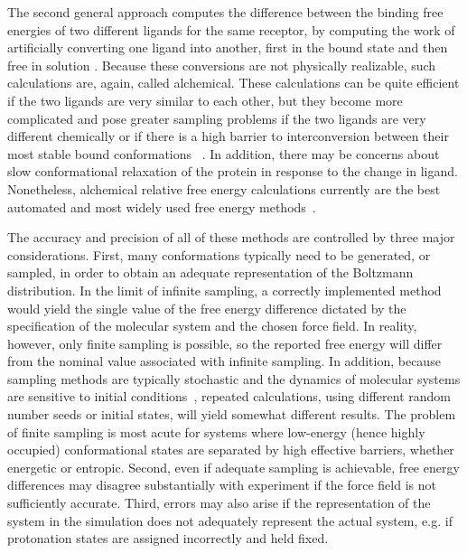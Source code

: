 \documentclass[aps,pre,twocolumn,nofootinbib,superscriptaddress,10pt, final,tightenlines]{revtex4-1}
\begin{document}
The second general approach computes the difference between the binding free energies of two different ligands for the same receptor, by computing the work of artificially converting one ligand into another, first in the bound state and then free in solution \cite{Tembe:1984:ComputChem, michel_prediction_2010, christ_basic_2010,  chodera_alchemical_2011}. 
Because these conversions are not physically realizable, such calculations are, again, called alchemical. These calculations can be quite efficient if the two ligands are very similar to each other, but they become more complicated and pose greater sampling problems if the two ligands are very different chemically or if there is a high barrier to interconversion between their most stable bound conformations ~\cite{liu_lead_2013}. 
In addition, there may be concerns about slow conformational relaxation of the protein in response to the change in ligand. 
Nonetheless, alchemical relative free energy calculations currently are the best automated and most widely used free energy methods~\cite{mobley_perspective_2012, liu_lead_2013, schrodinger_accurate_2015}.

The accuracy and precision of all of these methods are controlled by three major considerations.
First, many conformations typically need to be generated, or sampled, in order to obtain an adequate representation of the Boltzmann distribution. 
In the limit of infinite sampling, a correctly implemented method would yield the single value of the free energy difference dictated by the specification of the molecular system and the chosen force field. 
In reality, however, only finite sampling is possible, so the reported free energy will differ from the nominal value associated with infinite sampling. 
In addition, because sampling methods are typically stochastic and the dynamics of molecular systems are sensitive to initial conditions~\cite{allen_computer_1989}, repeated calculations, using different random number seeds or initial states, will yield somewhat different results. 
The problem of finite sampling is most acute for systems where low-energy (hence highly occupied) conformational states are separated by high effective barriers, whether energetic or entropic. 
Second, even if adequate sampling is achievable, free energy differences may disagree substantially with experiment if the force field is not sufficiently accurate. 
Third, errors may also arise if the representation of the system in the simulation does not adequately represent the actual system, e.g. if protonation states are assigned incorrectly and held fixed.  
\end{document}
